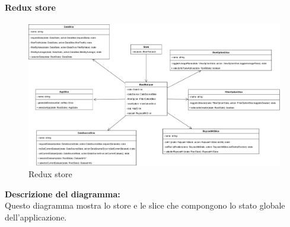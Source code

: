 \paragraph{Redux store}
\begin{figure}[h!] \centering
      \includegraphics[scale=0.17]{template/images/uml_front/logic/Store.png}
      \caption{Redux store}
\end{figure}
\textbf{Descrizione del diagramma:}\\
Questo diagramma mostra lo store e le slice che compongono lo stato globale dell'applicazione.
